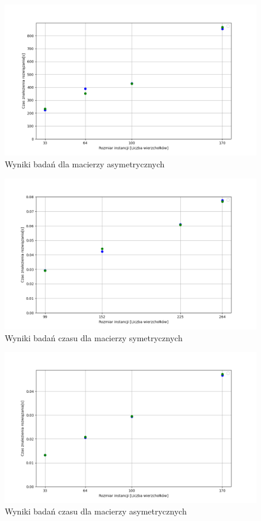 \documentclass{article}
\begin{document}
        \begin{figure}[ht]
          \centering
          \includegraphics[width=\textwidth]{src/plots/asymAnStartVal.png}
          \caption{Wyniki badań dla macierzy asymetrycznych}
          \label{fig:asymAnStartVal}
        \end{figure}
        \FloatBarrier
        
        \FloatBarrier
        \begin{figure}[ht]
          \centering
          \includegraphics[width=\textwidth]{src/plots/symAnStartValTime.png}
          \caption{Wyniki badań czasu  dla macierzy symetrycznych}
          \label{fig:symStartValT}
        \end{figure}
        \begin{figure}[ht]
          \centering
          \includegraphics[width=\textwidth]{src/plots/asymAnStartValTime.png}
          \caption{Wyniki badań czasu  dla macierzy asymetrycznych}
          \label{fig:asymStartValT}
        \end{figure}
\end{document}
